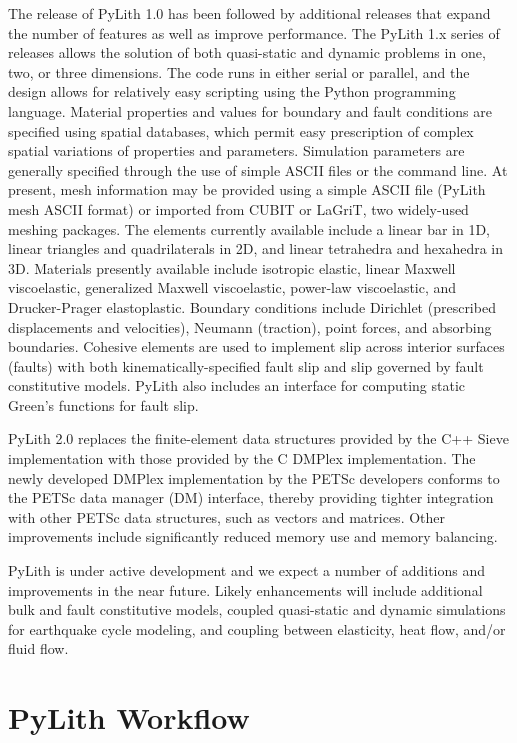 The release of PyLith 1.0 has been followed by additional releases
that expand the number of features as well as improve performance.
The PyLith 1.x series of releases allows the solution of both
quasi-static and dynamic problems in one, two, or three
dimensions. The code runs in either serial or parallel, and the design
allows for relatively easy scripting using the Python programming
language. Material properties and values for boundary and fault
conditions are specified using spatial databases, which permit easy
prescription of complex spatial variations of properties and
parameters. Simulation parameters are generally specified through the
use of simple ASCII files or the command line.  At present, mesh
information may be provided using a simple ASCII file (PyLith mesh
ASCII format) or imported from CUBIT or LaGriT, two widely-used
meshing packages. The elements currently available include a linear
bar in 1D, linear triangles and quadrilaterals in 2D, and linear
tetrahedra and hexahedra in 3D. Materials presently available include
isotropic elastic, linear Maxwell viscoelastic, generalized Maxwell
viscoelastic, power-law viscoelastic, and Drucker-Prager
elastoplastic. Boundary conditions include Dirichlet (prescribed
displacements and velocities), Neumann (traction), point forces, and
absorbing boundaries.  Cohesive elements are used to implement slip
across interior surfaces (faults) with both kinematically-specified
fault slip and slip governed by fault constitutive models. PyLith also
includes an interface for computing static Green's functions for fault
slip.

PyLith 2.0 replaces the finite-element data structures provided by the
C++ Sieve implementation with those provided by the C DMPlex
implementation.  The newly developed DMPlex implementation by the
PETSc developers conforms to the PETSc data manager (DM) interface,
thereby providing tighter integration with other PETSc data
structures, such as vectors and matrices. Other improvements include
significantly reduced memory use and memory balancing.

PyLith is under active development and we expect a number of additions
and improvements in the near future. Likely enhancements will include
additional bulk and fault constitutive models, coupled quasi-static
and dynamic simulations for earthquake cycle modeling, and coupling
between elasticity, heat flow, and/or fluid flow.


\section{PyLith Workflow}

